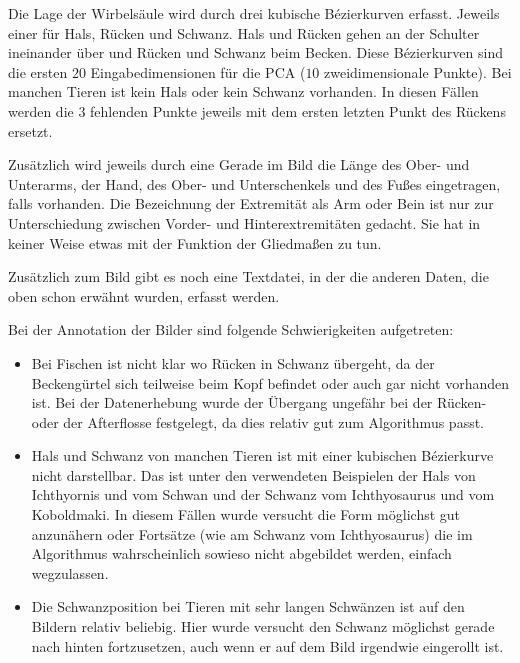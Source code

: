  Die Lage der Wirbelsäule wird durch drei kubische Bézierkurven erfasst. Jeweils einer für Hals, Rücken und Schwanz. Hals und Rücken gehen an der Schulter ineinander über und Rücken und Schwanz beim Becken.
 Diese Bézierkurven sind die ersten $20$ Eingabedimensionen für die PCA ($10$ zweidimensionale Punkte). Bei manchen Tieren ist kein Hals oder kein Schwanz vorhanden. In diesen Fällen werden die $3$ fehlenden Punkte jeweils mit dem ersten \bzw letzten Punkt des Rückens ersetzt.
 
 Zusätzlich wird jeweils durch eine Gerade im Bild die Länge des Ober- und Unterarms, der Hand, des Ober- und Unterschenkels und des Fußes eingetragen, falls vorhanden. Die Bezeichnung der Extremität als Arm oder Bein ist nur zur Unterschiedung zwischen Vorder- und Hinterextremitäten gedacht. Sie hat in keiner Weise etwas mit der Funktion der Gliedmaßen zu tun.
 
 Zusätzlich zum Bild gibt es noch eine Textdatei, in der die anderen Daten, die oben schon erwähnt wurden, erfasst werden.
 
 Bei der Annotation der Bilder sind folgende Schwierigkeiten aufgetreten:
 
 \begin{itemize}
  \item Bei Fischen ist nicht klar wo Rücken in Schwanz übergeht, da der Beckengürtel sich teilweise beim Kopf befindet oder auch gar nicht vorhanden ist. Bei der Datenerhebung wurde der Übergang ungefähr bei der Rücken- oder der Afterflosse festgelegt, da dies relativ gut zum Algorithmus passt.
  
  \item Hals und Schwanz von manchen Tieren ist mit einer kubischen Bézierkurve nicht darstellbar. Das ist unter den verwendeten Beispielen der Hals von Ichthyornis und vom Schwan und der Schwanz vom Ichthyosaurus und vom Koboldmaki. In diesem Fällen wurde versucht die Form möglichst gut anzunähern oder Fortsätze (wie am Schwanz vom Ichthyosaurus) die im Algorithmus wahrscheinlich sowieso nicht abgebildet werden, einfach wegzulassen.
  
  \item Die Schwanzposition bei Tieren mit sehr langen Schwänzen ist auf den Bildern relativ beliebig. Hier wurde versucht den Schwanz möglichst gerade nach hinten fortzusetzen, auch wenn er auf dem Bild irgendwie eingerollt ist.
 \end{itemize}
 

